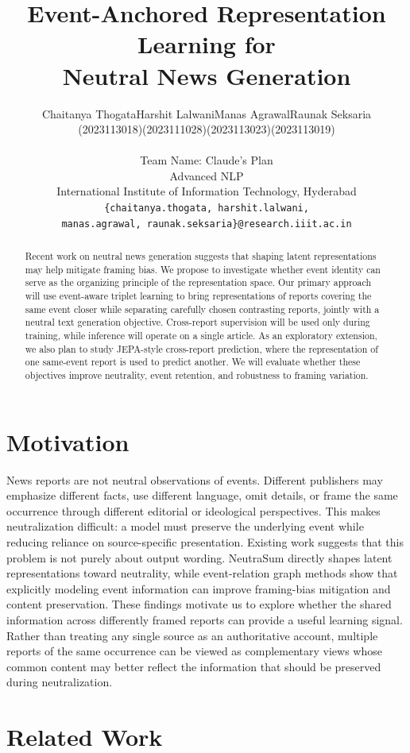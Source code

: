 \documentclass[11pt]{article}
\title{Event-Anchored Representation Learning for\\
Neutral News Generation}
\author{
  \begin{tabular}{@{}cccc@{}}
    Chaitanya Thogata & Harshit Lalwani & Manas Agrawal & Raunak Seksaria \\
    {\normalfont (2023113018)} & {\normalfont (2023111028)} &
    {\normalfont (2023113023)} & {\normalfont (2023113019)} \\
  \end{tabular} \\[3pt]
  Team Name: Claude's Plan \\[1pt]
  {\normalfont Advanced NLP} \\[1pt]
  {\normalfont International Institute of Information Technology, Hyderabad} \\[1pt]
  {\normalfont\small\texttt{\{chaitanya.thogata, harshit.lalwani,}} \\
  {\normalfont\small\texttt{manas.agrawal, raunak.seksaria\}@research.iiit.ac.in}}
}
\begin{document}
\maketitle

\begin{abstract}
Recent work on neutral news generation suggests that shaping latent
representations may help mitigate framing bias. We propose to investigate
whether event identity can serve as the organizing principle of the
representation space. Our primary approach will use event-aware triplet
learning to bring representations of reports covering the same event closer
while separating carefully chosen contrasting reports, jointly with a neutral
text generation objective. Cross-report supervision will be used only during
training, while inference will operate on a single article. As an exploratory
extension, we also plan to study JEPA-style cross-report prediction, where the
representation of one same-event report is used to predict another. We will
evaluate whether these objectives improve neutrality, event retention, and
robustness to framing variation.
\end{abstract}

\section{Motivation}


News reports are not neutral observations of events. Different publishers may
emphasize different facts, use different language, omit details, or frame the
same occurrence through different editorial or ideological perspectives. This
makes neutralization difficult: a model must preserve the underlying event
while reducing reliance on source-specific presentation. Existing work
suggests that this problem is not purely about output wording. NeutraSum
directly shapes latent representations toward neutrality, while event-relation
graph methods show that explicitly modeling event information can improve
framing-bias mitigation and content preservation. These findings motivate us
to explore whether the shared information across differently framed reports
can provide a useful learning signal. Rather than treating any single source
as an authoritative account, multiple reports of the same occurrence can be
viewed as complementary views whose common content may better reflect the
information that should be preserved during neutralization.

\section{Related Work}
\end{document}

